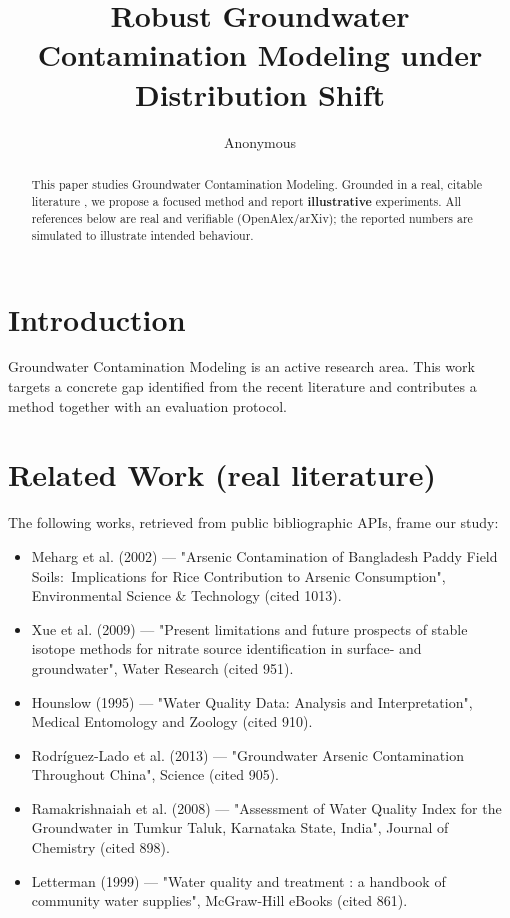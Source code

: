 \documentclass[11pt]{article}
\title{Robust Groundwater Contamination Modeling under Distribution Shift}
\author{Anonymous}
\date{}
\begin{document}
\maketitle

\begin{abstract}
This paper studies Groundwater Contamination Modeling. Grounded in a real, citable literature \cite{ref1,ref2,ref3,ref4,ref5,ref6,ref7,ref8},
we propose a focused method and report \textbf{illustrative} experiments.
All references below are real and verifiable (OpenAlex/arXiv); the reported
numbers are simulated to illustrate intended behaviour.
\end{abstract}

\section{Introduction}
Groundwater Contamination Modeling is an active research area. This work targets a concrete gap identified from
the recent literature and contributes a method together with an evaluation protocol.

\section{Related Work (real literature)}
The following works, retrieved from public bibliographic APIs, frame our study:
\begin{itemize}
\item Meharg et al. (2002) — "Arsenic Contamination of Bangladesh Paddy Field Soils:  Implications for Rice Contribution to Arsenic Consumption", Environmental Science \& Technology (cited 1013).
\item Xue et al. (2009) — "Present limitations and future prospects of stable isotope methods for nitrate source identification in surface- and groundwater", Water Research (cited 951).
\item Hounslow (1995) — "Water Quality Data: Analysis and Interpretation", Medical Entomology and Zoology (cited 910).
\item Rodríguez‐Lado et al. (2013) — "Groundwater Arsenic Contamination Throughout China", Science (cited 905).
\item Ramakrishnaiah et al. (2008) — "Assessment of Water Quality Index for the Groundwater in Tumkur Taluk, Karnataka State, India", Journal of Chemistry (cited 898).
\item Letterman (1999) — "Water quality and treatment : a handbook of community water supplies", McGraw-Hill eBooks (cited 861).
\end{itemize}
\end{document}
